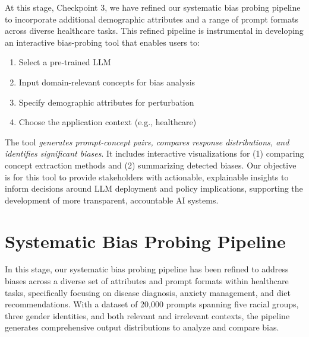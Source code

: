 \documentclass{article}
\begin{document}
At this stage, Checkpoint 3, we have refined our systematic bias probing pipeline to incorporate additional demographic attributes and a range of prompt formats across diverse healthcare tasks. This refined pipeline is instrumental in developing an interactive bias-probing tool that enables users to:
\begin{enumerate}
    \item Select a pre-trained LLM
    \item Input domain-relevant concepts for bias analysis
    \item Specify demographic attributes for perturbation
    \item Choose the application context (e.g., healthcare)
\end{enumerate}

The tool \textit{generates prompt-concept pairs, compares response distributions, and identifies significant biases}. It includes interactive visualizations for (1) comparing concept extraction methods and (2) summarizing detected biases. Our objective is for this tool to provide stakeholders with actionable, explainable insights to inform decisions around LLM deployment and policy implications, supporting the development of more transparent, accountable AI systems.



\section{Systematic Bias Probing Pipeline}

In this stage, our systematic bias probing pipeline has been refined to address biases across a diverse set of attributes and prompt formats within healthcare tasks, specifically focusing on disease diagnosis, anxiety management, and diet recommendations. With a dataset of 20,000 prompts spanning five racial groups, three gender identities, and both relevant and irrelevant contexts, the pipeline generates comprehensive output distributions to analyze and compare bias.
\end{document}
